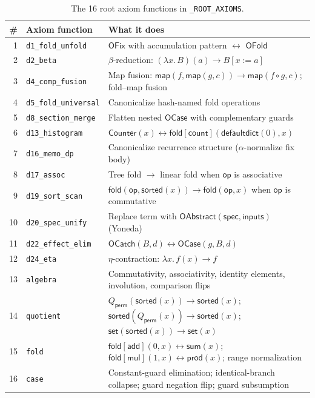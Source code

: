 \documentclass[11pt,a4paper]{report}
\theoremstyle{definition}
\theoremstyle{plain}
\newcommand{\fold}{\mathsf{fold}}
\begin{document}
\begin{table}[h]
\centering
\small
\caption{The 16 root axiom functions in \texttt{\_ROOT\_AXIOMS}.}
\label{tab:root-axioms}
\begin{tabular}{r l p{7cm}}
\toprule
\# & \textbf{Axiom function} & \textbf{What it does} \\
\midrule
1 & \texttt{d1\_fold\_unfold} &
  $\mathsf{OFix}$ with accumulation pattern $\leftrightarrow$
  $\mathsf{OFold}$ \\
2 & \texttt{d2\_beta} &
  $\beta$-reduction: $(\lambda x.\,B)(a) \to B[x := a]$ \\
3 & \texttt{d4\_comp\_fusion} &
  Map fusion: $\mathsf{map}(f, \mathsf{map}(g, c)) \to
  \mathsf{map}(f \circ g, c)$; fold--map fusion \\
4 & \texttt{d5\_fold\_universal} &
  Canonicalize hash-named fold operations \\
5 & \texttt{d8\_section\_merge} &
  Flatten nested $\mathsf{OCase}$ with complementary guards \\
6 & \texttt{d13\_histogram} &
  $\mathsf{Counter}(x) \leftrightarrow
  \fold[\mathsf{count}](\mathsf{defaultdict}(0), x)$ \\
7 & \texttt{d16\_memo\_dp} &
  Canonicalize recurrence structure ($\alpha$-normalize fix body) \\
8 & \texttt{d17\_assoc} &
  Tree fold $\to$ linear fold when $\mathsf{op}$ is associative \\
9 & \texttt{d19\_sort\_scan} &
  $\fold(\mathsf{op}, \mathsf{sorted}(x)) \to \fold(\mathsf{op}, x)$
  when $\mathsf{op}$ is commutative \\
10 & \texttt{d20\_spec\_unify} &
  Replace term with $\mathsf{OAbstract}(\mathsf{spec}, \mathsf{inputs})$
  (Yoneda) \\
11 & \texttt{d22\_effect\_elim} &
  $\mathsf{OCatch}(B, d) \leftrightarrow
  \mathsf{OCase}(g, B, d)$ \\
12 & \texttt{d24\_eta} &
  $\eta$-contraction: $\lambda x.\,f(x) \to f$ \\
13 & \texttt{algebra} &
  Commutativity, associativity, identity elements, involution,
  comparison flips \\
14 & \texttt{quotient} &
  $Q_\mathsf{perm}(\mathsf{sorted}(x)) \to \mathsf{sorted}(x)$;
  $\mathsf{sorted}(Q_\mathsf{perm}(x)) \to \mathsf{sorted}(x)$;
  $\mathsf{set}(\mathsf{sorted}(x)) \to \mathsf{set}(x)$ \\
15 & \texttt{fold} &
  $\fold[\mathsf{add}](0,x) \leftrightarrow \mathsf{sum}(x)$;
  $\fold[\mathsf{mul}](1,x) \leftrightarrow \mathsf{prod}(x)$;
  range normalization \\
16 & \texttt{case} &
  Constant-guard elimination; identical-branch collapse;
  guard negation flip; guard subsumption \\
\bottomrule
\end{tabular}
\end{table}
\end{document}
